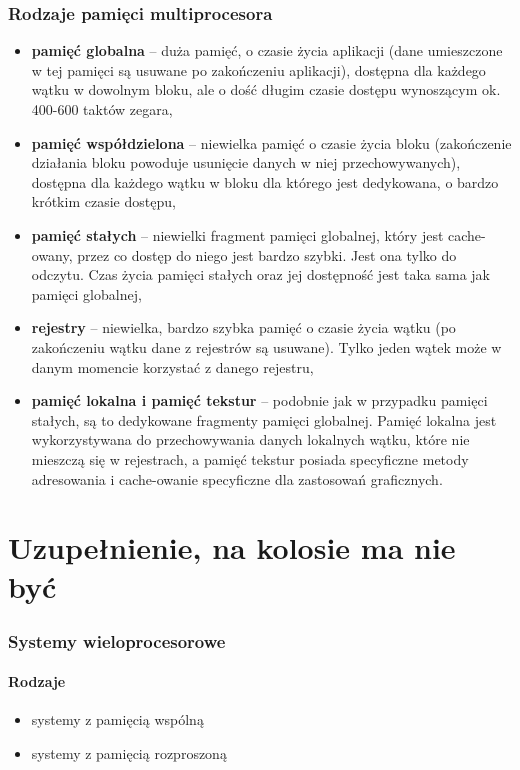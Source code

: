 		\section*{Rodzaje pamięci multiprocesora}
		\begin{itemize}
			\item \textbf{pamięć globalna} – duża pamięć, o czasie życia aplikacji (dane umieszczone w tej pamięci są usuwane po zakończeniu aplikacji), dostępna dla każdego wątku w dowolnym bloku, ale o dość długim czasie dostępu wynoszącym ok. 400-600 taktów zegara,
			\item \textbf{pamięć współdzielona} – niewielka pamięć o czasie życia bloku (zakończenie działania bloku powoduje usunięcie danych w niej przechowywanych), dostępna dla każdego wątku w bloku dla którego jest dedykowana, o bardzo krótkim czasie dostępu,
			\item \textbf{pamięć stałych} – niewielki fragment pamięci globalnej, który jest cache-owany, przez co dostęp do niego jest bardzo szybki. Jest ona tylko do odczytu. Czas życia pamięci stałych oraz jej dostępność jest taka sama jak pamięci globalnej,
			\item \textbf{rejestry} – niewielka, bardzo szybka pamięć o czasie życia wątku (po zakończeniu wątku dane z rejestrów są usuwane). Tylko jeden wątek może w danym momencie korzystać z danego rejestru,
			\item \textbf{pamięć lokalna i pamięć tekstur} – podobnie jak w przypadku pamięci stałych, są to dedykowane fragmenty pamięci globalnej. Pamięć lokalna jest wykorzystywana do przechowywania danych lokalnych wątku, które nie mieszczą się w rejestrach, a pamięć tekstur posiada specyficzne metody adresowania i cache-owanie specyficzne dla zastosowań graficznych.
		\end{itemize}
		
\part*{Uzupełnienie, na kolosie ma nie być}
	\section*{Systemy wieloprocesorowe}
		\subsection*{Rodzaje}
		\begin{itemize}
			\item systemy z pamięcią wspólną
			\item systemy z pamięcią rozproszoną
		\end{itemize}
